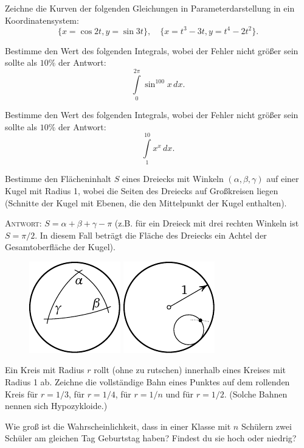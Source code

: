 \documentclass[12pt]{article} %
\begin{document}
\bigskip
{} Zeichne die Kurven der folgenden Gleichungen in Parameterdarstellung in ein Koordinatensystem: 
\[
\{x=\cos 2t, y=\sin 3t\},\quad 
\{x=t^3-3t, y=t^4-2t^2\}.
\]

\bigskip
{} Bestimme den Wert des folgenden Integrals, wobei der Fehler nicht größer sein sollte als $10\%$ der Antwort: 
$$
\int\limits_0^{2\pi} \sin^{100} x\,dx.
$$

\bigskip
{} 
Bestimme den Wert des folgenden Integrals, wobei der Fehler nicht größer sein sollte als $10\%$ der Antwort: 
$$
\int\limits_1^{10} x^x\,dx.
$$

\bigskip
{} Bestimme den Flächeninhalt $S$ eines Dreiecks mit Winkeln $(\alpha, \beta, \gamma)$ auf einer Kugel mit Radius 1, wobei die Seiten des Dreiecks auf Großkreisen liegen (Schnitte der Kugel mit Ebenen, die den Mittelpunkt der Kugel enthalten).

\medskip
\textsc{Antwort:} $S=\alpha+\beta+\gamma-\pi$ (z.B. für ein Dreieck mit drei rechten Winkeln ist $S=\pi/2$. In diesem Fall beträgt die Fläche des Dreiecks ein Achtel der Gesamtoberfläche der Kugel).
\begin{figure}[h]
\centering
\includegraphics{taskbook-44}\hskip2cm \includegraphics{taskbook-45}
\end{figure}

\bigskip
{} Ein Kreis mit Radius $r$ rollt (ohne zu rutschen) innerhalb eines Kreises mit Radius 1 ab.
Zeichne die vollständige Bahn eines Punktes auf dem rollenden Kreis für $r=1/3$, für $r=1/4$, für $r=1/n$ und für $r=1/2$. (Solche Bahnen nennen sich Hypozykloide.)

\bigskip
{} Wie groß ist die Wahrscheinlichkeit, dass in einer Klasse mit $n$ Schülern zwei Schüler am gleichen Tag Geburtstag haben? Findest du sie hoch oder niedrig?
\end{document}
